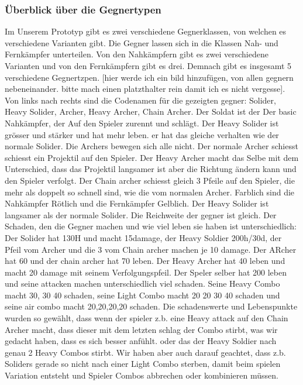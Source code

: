 \documentclass[../Main.tex]{subfiles}
\begin{document}
\subsubsection{Überblick über die Gegnertypen} \label{sec:Gegnertypen}
Im Unserem Prototyp gibt es zwei verschiedene Gegnerklassen, von welchen es verschiedene Varianten gibt. Die Gegner lassen sich in die Klassen Nah- und Fernkämpfer unterteilen. Von den Nahkämpfern gibt es zwei verschiedene Varianten und von den Fernkämpfern gibt es drei. Demnach gibt es insgesamt 5 verschiedene Gegnertzpen. [hier werde ich ein bild hinzufügen, von allen gegnern nebeneinander. bitte mach einen platzthalter rein damit ich es nicht vergesse]. Von links nach rechts sind die Codenamen für die gezeigten gegner: Solider, Heavy Solider, Archer, Heavy Archer, Chain Archer. Der Soldat ist der Der basic Nahkämpfer, der Auf den Spieler zurennt und schlägt. Der Heavy Solider ist grösser und stärker und hat mehr leben. er hat das gleiche verhalten wie der normale Solider. Die Archers bewegen sich alle nicht. Der normale Archer schiesst schiesst ein Projektil auf den Spieler. Der Heavy Archer macht das Selbe mit dem Unterschied, dass das Projektil langsamer ist aber die Richtung ändern kann und den Spieler verfolgt. Der Chain archer schiesst gleich 3 Pfeile auf den Spieler, die mehr als doppelt so schnell sind, wie die vom normalen Archer. Farblich sind die Nahkämpfer Rötlich und die Fernkämpfer Gelblich. Der Heavy Solider ist langsamer als der normale Solider. Die Reichweite der gegner ist gleich. Der Schaden, den die Gegner machen und wie viel leben sie haben ist unterschiedlich: Der Solider hat 130H und macht 15damage, der Heavy Soldier 200h/30d, der Pfeil vom Archer und die 3 vom Chain archer machen je 10 damage. Der ARcher hat 60 und der chain archer hat 70 leben. Der Heavy Archer hat 40 leben und macht 20 damage mit seinem Verfolgungspfeil. Der Speler selber hat 200 leben und seine attacken machen unterschiedlich viel schaden. Seine Heavy Combo macht 30, 30 40 schaden, seine Light Combo macht 20 20 30 40 schaden und seine air combo macht 20,20,20,20 schaden. Die schadenswerte und Lebenspunkte wurden so gewählt, dass wenn der spieler z.b. eine Heavy attack auf den Chain Archer macht, dass dieser mit dem letzten schlag der Combo stirbt, was wir gedacht haben, dass es sich besser anfühlt. oder das der Heavy Soldier nach genau 2 Heavy Combos stirbt. Wir haben aber auch darauf geachtet, dass z.b. Soliders gerade so nicht nach einer Light Combo sterben, damit beim spielen Variation entsteht und Spieler Combos abbrechen oder kombinieren müssen.
\end{document}

